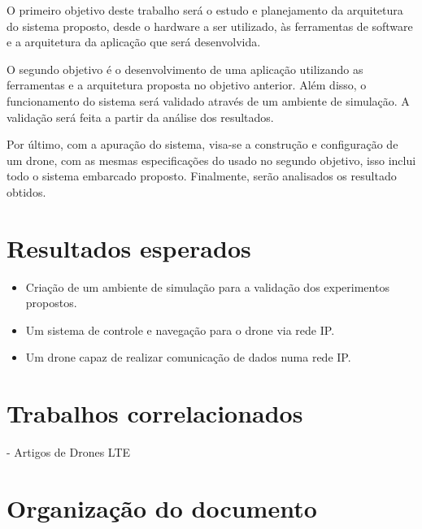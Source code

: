 \documentclass[12pt,a4paper,oneside]{book}
\begin{document}
O primeiro objetivo deste trabalho será o estudo e planejamento da arquitetura do sistema proposto, desde o hardware a ser utilizado, às ferramentas de software e a arquitetura da aplicação que será desenvolvida. 

O segundo objetivo é o desenvolvimento de uma aplicação utilizando as ferramentas e a arquitetura proposta no objetivo anterior. Além disso, o funcionamento do sistema será validado através de um ambiente de simulação. A validação será feita a partir da análise dos resultados.

Por último, com a apuração do sistema, visa-se a construção e configuração de um drone, com as mesmas especificações do usado no segundo objetivo, isso inclui todo o sistema embarcado proposto. Finalmente, serão analisados os resultado obtidos.  

\section{Resultados esperados}

\begin{itemize}
\item Criação de um ambiente de simulação para a validação dos experimentos propostos.
\item Um sistema de controle e navegação para o drone via rede IP.
\item Um drone capaz de realizar comunicação de dados numa rede IP.    
\end{itemize}

\section{Trabalhos correlacionados}

 - Artigos de Drones LTE
 \cite{artigo_relacionado_1}

\section{Organização do documento}
\end{document}

